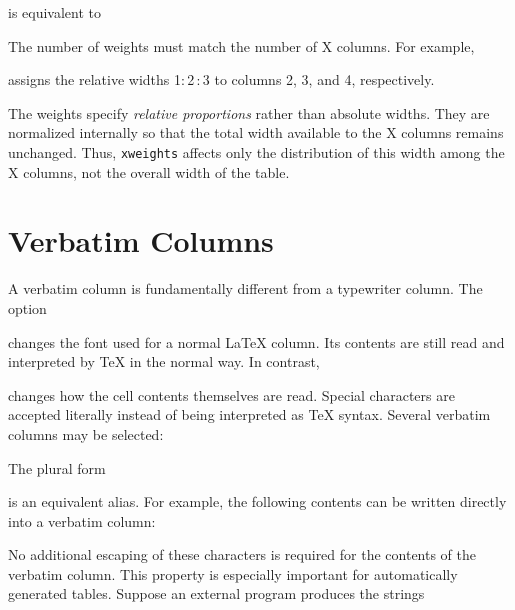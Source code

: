 \documentclass[
11pt,
a4paper,
oneside
]{scrbook}
\begin{document}


is equivalent to





The number of weights must match the number of X columns. For example,




assigns the relative widths 1:\,2\,:\,3 to columns 2, 3, and 4, respectively.

The weights specify \emph{relative proportions} rather than absolute widths.
They are normalized internally so that the total width available to the
X columns remains unchanged. Thus, \texttt{xweights} affects only the
distribution of this width among the X columns, not the overall width of
the table.

\section{Verbatim Columns}

A verbatim column is fundamentally different from a typewriter column.
The option




changes the font used for a normal \LaTeX{} column. Its contents are still
read and interpreted by \TeX{} in the normal way.
In contrast,




changes how the cell contents themselves are read. Special characters are
accepted literally instead of being interpreted as \TeX{} syntax.
Several verbatim columns may be selected:




The plural form




is an equivalent alias.
For example, the following contents can be written directly into a verbatim
column:




No additional escaping of these characters is required for the contents of
the verbatim column.
This property is especially important for automatically generated tables.
Suppose an external program produces the strings


\end{document}
